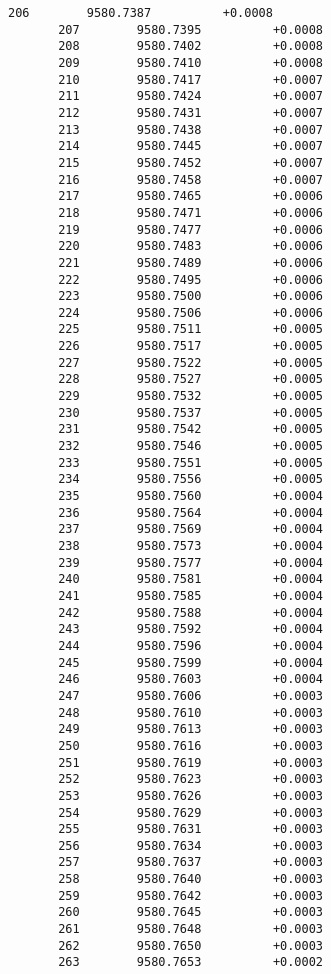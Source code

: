 \documentclass[11pt]{article}
\begin{document}
\begin{Verbatim}[commandchars=\\\{\}]
       206        9580.7387          +0.0008
       207        9580.7395          +0.0008
       208        9580.7402          +0.0008
       209        9580.7410          +0.0008
       210        9580.7417          +0.0007
       211        9580.7424          +0.0007
       212        9580.7431          +0.0007
       213        9580.7438          +0.0007
       214        9580.7445          +0.0007
       215        9580.7452          +0.0007
       216        9580.7458          +0.0007
       217        9580.7465          +0.0006
       218        9580.7471          +0.0006
       219        9580.7477          +0.0006
       220        9580.7483          +0.0006
       221        9580.7489          +0.0006
       222        9580.7495          +0.0006
       223        9580.7500          +0.0006
       224        9580.7506          +0.0006
       225        9580.7511          +0.0005
       226        9580.7517          +0.0005
       227        9580.7522          +0.0005
       228        9580.7527          +0.0005
       229        9580.7532          +0.0005
       230        9580.7537          +0.0005
       231        9580.7542          +0.0005
       232        9580.7546          +0.0005
       233        9580.7551          +0.0005
       234        9580.7556          +0.0005
       235        9580.7560          +0.0004
       236        9580.7564          +0.0004
       237        9580.7569          +0.0004
       238        9580.7573          +0.0004
       239        9580.7577          +0.0004
       240        9580.7581          +0.0004
       241        9580.7585          +0.0004
       242        9580.7588          +0.0004
       243        9580.7592          +0.0004
       244        9580.7596          +0.0004
       245        9580.7599          +0.0004
       246        9580.7603          +0.0004
       247        9580.7606          +0.0003
       248        9580.7610          +0.0003
       249        9580.7613          +0.0003
       250        9580.7616          +0.0003
       251        9580.7619          +0.0003
       252        9580.7623          +0.0003
       253        9580.7626          +0.0003
       254        9580.7629          +0.0003
       255        9580.7631          +0.0003
       256        9580.7634          +0.0003
       257        9580.7637          +0.0003
       258        9580.7640          +0.0003
       259        9580.7642          +0.0003
       260        9580.7645          +0.0003
       261        9580.7648          +0.0003
       262        9580.7650          +0.0003
       263        9580.7653          +0.0002

\end{Verbatim}
\end{document}
